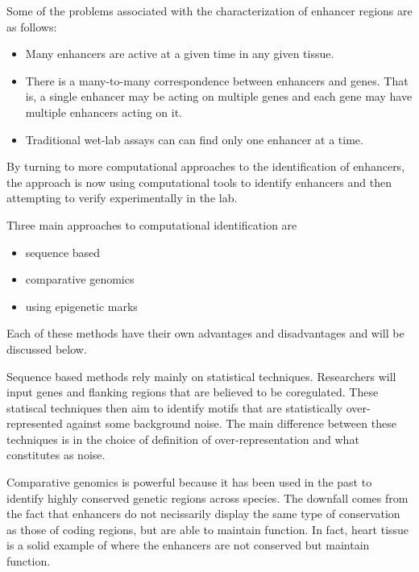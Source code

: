         Some of the problems associated with the characterization of enhancer regions are as follows:
        	\begin{itemize}
        		\item Many enhancers are active at a given time in any given tissue. 
        		\item There is a many-to-many correspondence between enhancers and genes. That is, a single enhancer may be acting on multiple genes and each gene may have multiple enhancers acting on it. 
        		\item Traditional wet-lab assays can can find only one enhancer at a time.
        	\end{itemize}
        By turning to more computational approaches to the identification of enhancers, the approach is now using computational tools to identify enhancers and then attempting to verify experimentally in the lab.

        Three main approaches to computational identification are
        	\begin{itemize}
        		\item sequence based 
        		\item comparative genomics
        		\item using epigenetic marks
        	\end{itemize}

        Each of these methods have their own advantages and disadvantages and will be discussed below.

        Sequence based methods rely mainly on statistical techniques. Researchers will input genes and flanking regions that are believed to be coregulated. These statiscal techniques then aim to identify motifs that are statistically over-represented against some background noise. The main difference between these techniques is in the choice of definition of over-representation and what constitutes as noise.

        Comparative genomics is powerful because it has been used in the past to identify highly conserved genetic regions across species. The downfall comes from the fact that enhancers do not necissarily display the same type of conservation as those of coding regions, but are able to maintain function. In fact, heart tissue is a solid example of where the enhancers are not conserved but maintain function. 



